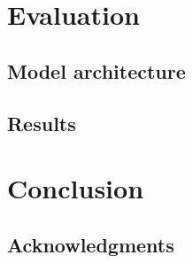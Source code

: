 \documentclass{article}
\begin{document}
\section{Evaluation}



\subsection{Model architecture}

\subsection{Results}


\section{Conclusion}


\subsection*{Acknowledgments}



\end{document}
